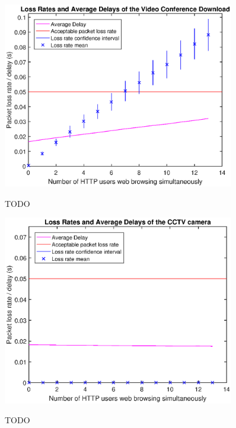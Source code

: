 \documentclass[a4paper,10pt]{book}\usepackage{graphicx}
\begin{document}
\begin{figure}[!ht]
  \centering
    \includegraphics[width=0.9\textwidth]{on_loss_conf_download.eps}
    \label{fig:on_loss_conf_download}
    \caption{TODO}
\end{figure}

\begin{figure}[!ht]
  \centering
    \includegraphics[width=0.9\textwidth]{on_loss_cctv.eps}
    \label{fig:on_loss_cctv}
    \caption{TODO}
\end{figure}
\end{document}

